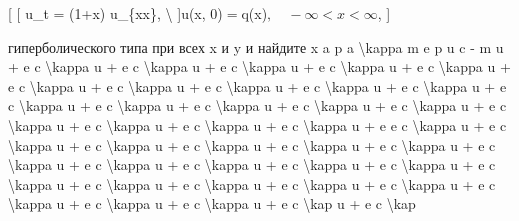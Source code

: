 \documentclass[
]{article}
\begin{document}
{{{[} {[} u\_t = (1+x) u\_\{xx\}, \textbackslash{} {]}u(x,
0)\(=\)q(x)\(, \quad -\infty < x < \infty\), {]}

гиперболического типа при всех x и y и найдите x a p a
\textbackslash kappa m e p u c - m u + e c \textbackslash kappa u + e c
\textbackslash kappa u + e c \textbackslash kappa u + e c
\textbackslash kappa u + e c \textbackslash kappa u + e c
\textbackslash kappa u + e c \textbackslash kappa u + e c
\textbackslash kappa u + e c \textbackslash kappa u + e c
\textbackslash kappa u + e c \textbackslash kappa u + e c
\textbackslash kappa u + e c \textbackslash kappa u + e c
\textbackslash kappa u + e c \textbackslash kappa u + e c
\textbackslash kappa u + e c \textbackslash kappa u + e c
\textbackslash kappa u + e c \textbackslash kappa u + e e c
\textbackslash kappa u + e c \textbackslash kappa u + e c
\textbackslash kappa u + e c \textbackslash kappa u + e c
\textbackslash kappa u + e c \textbackslash kappa u + e c
\textbackslash kappa u + e c \textbackslash kappa u + e c
\textbackslash kappa u + e c \textbackslash kappa u + e c
\textbackslash kappa u + e c \textbackslash kappa u + e c
\textbackslash kappa u + e c \textbackslash kappa u + e c
\textbackslash kappa u + e c \textbackslash kappa u + e c
\textbackslash kappa u + e c \textbackslash kappa u + e c
\textbackslash kappa u + e c \textbackslash kap u + e c
\textbackslash kap

}}
\end{document}
